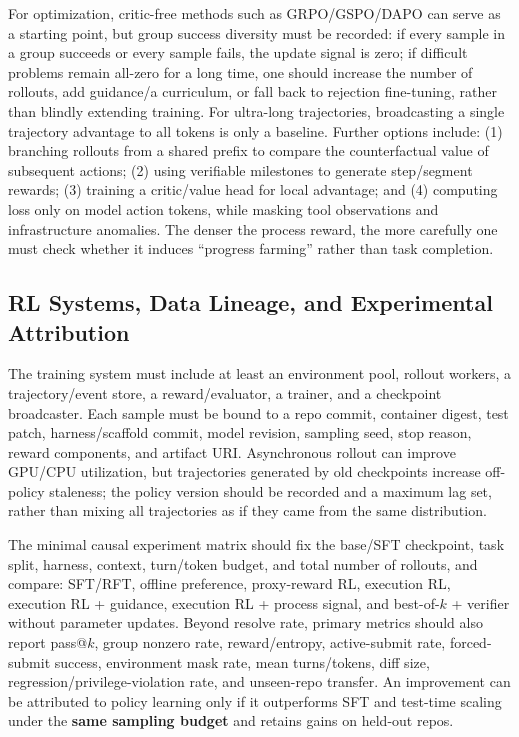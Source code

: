 \documentclass[10pt,a4paper,UTF8,fontset=none]{ctexart}
\begin{document}
For optimization, critic-free methods such as GRPO/GSPO/DAPO can serve as a starting point, but group success diversity must be recorded: if every sample in a group succeeds or every sample fails, the update signal is zero; if difficult problems remain all-zero for a long time, one should increase the number of rollouts, add guidance/a curriculum, or fall back to rejection fine-tuning, rather than blindly extending training. For ultra-long trajectories, broadcasting a single trajectory advantage to all tokens is only a baseline. Further options include: (1) branching rollouts from a shared prefix to compare the counterfactual value of subsequent actions; (2) using verifiable milestones to generate step/segment rewards; (3) training a critic/value head for local advantage; and (4) computing loss only on model action tokens, while masking tool observations and infrastructure anomalies. The denser the process reward, the more carefully one must check whether it induces ``progress farming'' rather than task completion.

\subsection{RL Systems, Data Lineage, and Experimental Attribution}

The training system must include at least an environment pool, rollout workers, a trajectory/event store, a reward/evaluator, a trainer, and a checkpoint broadcaster. Each sample must be bound to a repo commit, container digest, test patch, harness/scaffold commit, model revision, sampling seed, stop reason, reward components, and artifact URI. Asynchronous rollout can improve GPU/CPU utilization, but trajectories generated by old checkpoints increase off-policy staleness; the policy version should be recorded and a maximum lag set, rather than mixing all trajectories as if they came from the same distribution.

The minimal causal experiment matrix should fix the base/SFT checkpoint, task split, harness, context, turn/token budget, and total number of rollouts, and compare: SFT/RFT, offline preference, proxy-reward RL, execution RL, execution RL + guidance, execution RL + process signal, and best-of-$k$ + verifier without parameter updates. Beyond resolve rate, primary metrics should also report pass@$k$, group nonzero rate, reward/entropy, active-submit rate, forced-submit success, environment mask rate, mean turns/tokens, diff size, regression/privilege-violation rate, and unseen-repo transfer. An improvement can be attributed to policy learning only if it outperforms SFT and test-time scaling under the \textbf{same sampling budget} and retains gains on held-out repos.
\end{document}
